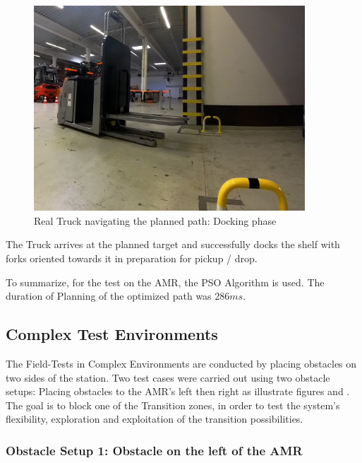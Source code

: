 \begin{figure}[H]
    \begin{center}
        \includegraphics[width=4in]{images/Chap3/Test1_real_dock.png} %
        \caption{Real Truck navigating the planned path: Docking phase}
        \label{OptResult61}
        \end{center}    
\end{figure}

The Truck arrives at the planned target and successfully 
docks the shelf with forks oriented towards it in preparation for
pickup / drop.

To summarize, for the test on the AMR, the PSO Algorithm is used. The duration of Planning of the optimized 
path was \(286ms\). 



\subsection{Complex Test Environments}
The Field-Tests in Complex Environments are conducted by placing obstacles on two sides of the 
station. 
Two test cases were carried out using two obstacle setups: Placing obstacles to the AMR's left then right
as illustrate figures  and . 
The goal is to block one of the Transition zones, in order to test the system's flexibility,
exploration and exploitation of the transition possibilities.



\subsubsection{Obstacle Setup 1: Obstacle on the left of the AMR}

